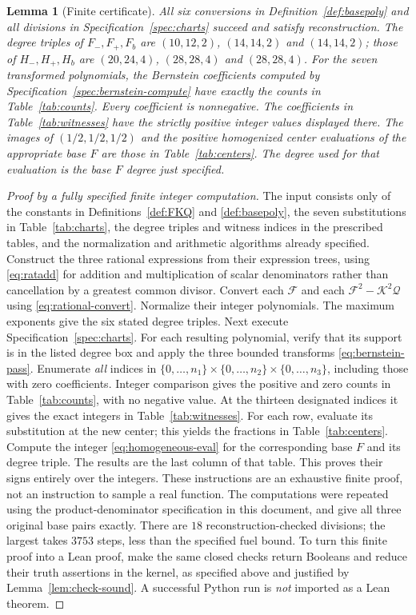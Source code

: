 \documentclass[11pt,a4paper]{article}
\newtheorem{lemma}{Lemma}[section]
\theoremstyle{definition}
\begin{document}
\begin{lemma}[Finite certificate]\label{lem:finite-certificate}
All six conversions in Definition~\ref{def:basepoly} and all divisions in Specification~\ref{spec:charts} succeed and satisfy reconstruction. The degree triples of $F_-,F_+,F_b$ are $(10,12,2)$, $(14,14,2)$ and $(14,14,2)$; those of $H_-,H_+,H_b$ are $(20,24,4)$, $(28,28,4)$ and $(28,28,4)$.
For the seven transformed polynomials, the Bernstein coefficients computed by Specification~\ref{spec:bernstein-compute} have exactly the counts in Table~\ref{tab:counts}. Every coefficient is nonnegative. The coefficients in Table~\ref{tab:witnesses} have the strictly positive integer values displayed there.
The images of $(1/2,1/2,1/2)$ and the positive homogenized center evaluations of the appropriate base $F$ are those in Table~\ref{tab:centers}. The degree used for that evaluation is the base $F$ degree just specified.
\end{lemma}
\begin{proof}[Proof by a fully specified finite integer computation]
The input consists only of the constants in Definitions~\ref{def:FKQ} and \ref{def:basepoly}, the seven substitutions in Table~\ref{tab:charts}, the degree triples and witness indices in the prescribed tables, and the normalization and arithmetic algorithms already specified.
Construct the three rational expressions from their expression trees, using \eqref{eq:ratadd} for addition and multiplication of scalar denominators rather than cancellation by a greatest common divisor. Convert each $\mathcal F$ and each $\mathcal F^2-\mathcal K^2\mathcal Q$ using \eqref{eq:rational-convert}. Normalize their integer polynomials. The maximum exponents give the six stated degree triples.
Next execute Specification~\ref{spec:charts}. For each resulting polynomial, verify that its support is in the listed degree box and apply the three bounded transforms \eqref{eq:bernstein-pass}. Enumerate \emph{all} indices in
$\{0,\ldots,n_1\}\times\{0,\ldots,n_2\}\times\{0,\ldots,n_3\}$, including those with zero coefficients. Integer comparison gives the positive and zero counts in Table~\ref{tab:counts}, with no negative value. At the thirteen designated indices it gives the exact integers in Table~\ref{tab:witnesses}.
For each row, evaluate its substitution at the new center; this yields the fractions in Table~\ref{tab:centers}. Compute the integer \eqref{eq:homogeneous-eval} for the corresponding base $F$ and its degree triple. The results are the last column of that table. This proves their signs entirely over the integers.
These instructions are an exhaustive finite proof, not an instruction to sample a real function. The computations were repeated using the product-denominator specification in this document, and give all three original base pairs exactly. There are $18$ reconstruction-checked divisions; the largest takes $3753$ steps, less than the specified fuel bound. To turn this finite proof into a Lean proof, make the same closed checks return Booleans and reduce their truth assertions in the kernel, as specified above and justified by Lemma~\ref{lem:check-sound}. A successful Python run is \emph{not} imported as a Lean theorem.
\end{proof}
\end{document}
